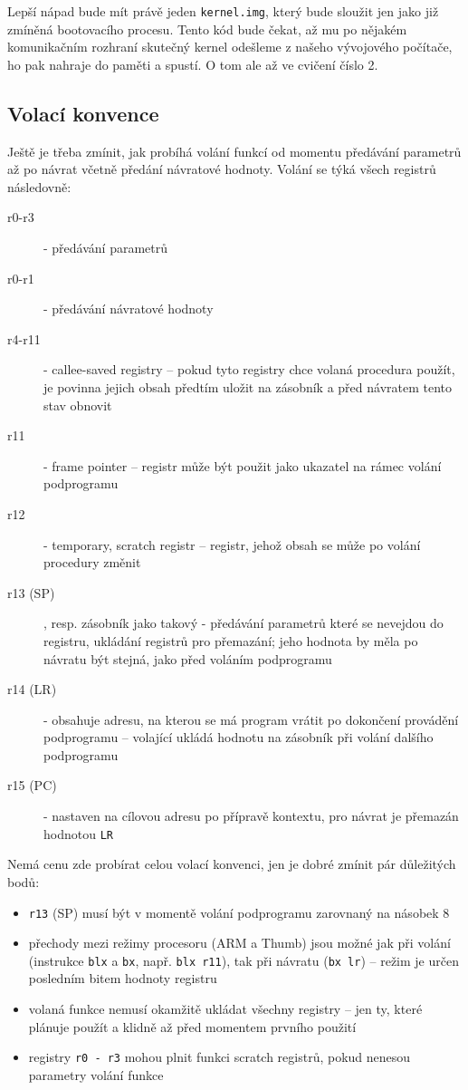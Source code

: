 \documentclass{article}
\begin{document}
Lepší nápad bude mít právě jeden \texttt{kernel.img}, který bude sloužit jen jako již zmíněná  bootovacího procesu. Tento kód bude čekat, až mu po nějakém komunikačním rozhraní skutečný kernel odešleme z našeho vývojového počítače,  ho pak nahraje do paměti a spustí. O tom ale až ve cvičení číslo 2.

\subsection{Volací konvence}

Ještě je třeba zmínit, jak probíhá volání funkcí od momentu předávání parametrů až po návrat včetně předání návratové hodnoty. Volání se týká všech registrů následovně:

\begin{description}
	\item[r0-r3] - předávání parametrů
	\item[r0-r1] - předávání návratové hodnoty
	\item[r4-r11] - callee-saved registry -- pokud tyto registry chce volaná procedura použít, je povinna jejich obsah předtím uložit na zásobník a před návratem tento stav obnovit
	\item[r11] - frame pointer -- registr může být použit jako ukazatel na rámec volání podprogramu
	\item[r12] - temporary, scratch registr -- registr, jehož obsah se může po volání procedury změnit
	\item[r13 (SP)], resp. zásobník jako takový - předávání parametrů které se nevejdou do registru, ukládání registrů pro přemazání; jeho hodnota by měla po návratu být stejná, jako před voláním podprogramu
	\item[r14 (LR)] - obsahuje adresu, na kterou se má program vrátit po dokončení provádění podprogramu -- volající ukládá hodnotu na zásobník při volání dalšího podprogramu
	\item[r15 (PC)] - nastaven na cílovou adresu po přípravě kontextu, pro návrat je přemazán hodnotou \texttt{LR}
\end{description}

Nemá cenu zde probírat celou volací konvenci, jen je dobré zmínit pár důležitých bodů:
\begin{itemize}
	\item \texttt{r13} (SP) musí být v momentě volání podprogramu zarovnaný na násobek 8
	\item přechody mezi režimy procesoru (ARM a Thumb) jsou možné jak při volání (instrukce \texttt{blx} a \texttt{bx}, např. \texttt{blx r11}), tak při návratu (\texttt{bx lr}) -- režim je určen posledním bitem hodnoty registru
	\item volaná funkce nemusí okamžitě ukládat všechny registry -- jen ty, které plánuje použít a klidně až před momentem prvního použití
	\item registry \texttt{r0 - r3} mohou plnit funkci scratch registrů, pokud nenesou parametry volání funkce
\end{itemize}
\end{document}
